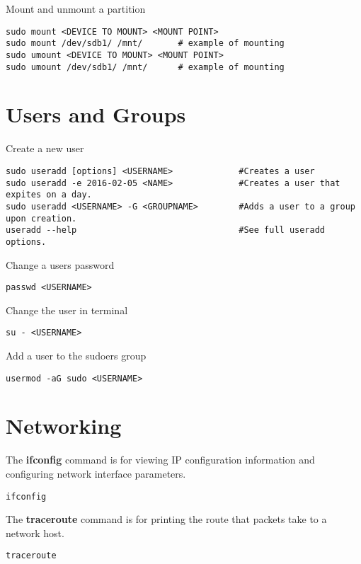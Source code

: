 Mount and unmount a partition
\begin{lstlisting}
sudo mount <DEVICE TO MOUNT> <MOUNT POINT>
sudo mount /dev/sdb1/ /mnt/       # example of mounting
sudo umount <DEVICE TO MOUNT> <MOUNT POINT>
sudo umount /dev/sdb1/ /mnt/      # example of mounting
\end{lstlisting}

\section{Users and Groups}

Create a new user
\begin{lstlisting}
sudo useradd [options] <USERNAME>             #Creates a user
sudo useradd -e 2016-02-05 <NAME>             #Creates a user that expites on a day.
sudo useradd <USERNAME> -G <GROUPNAME>        #Adds a user to a group upon creation.
useradd --help                                #See full useradd options.
\end{lstlisting}

Change a users password
\begin{lstlisting}
passwd <USERNAME>
\end{lstlisting}

Change the user in terminal
\begin{lstlisting}
su - <USERNAME>
\end{lstlisting}

Add a user to the sudoers group
\begin{lstlisting}
usermod -aG sudo <USERNAME>
\end{lstlisting}













\section{Networking}

The \textbf{ifconfig} command is for viewing IP configuration information and configuring network interface parameters.
\begin{lstlisting}
ifconfig
\end{lstlisting}

The \textbf{traceroute} command is for printing the route that packets take to a network host.
\begin{lstlisting}
traceroute
\end{lstlisting}

